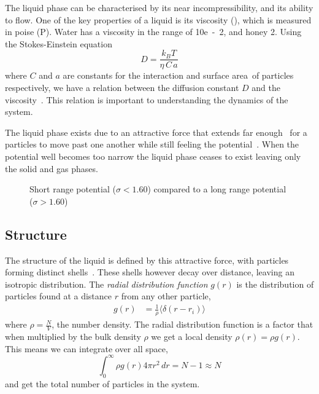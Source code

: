 The liquid phase can be characterised by its near incompressibility, and its ability to flow. One of the key properties of a liquid is its viscosity (\eta), which is measured in poise (P). Water has a viscosity in the range of \si{10e-2}{\poise}, and honey \si{2}{\poise}. Using the Stokes-Einstein equation
\begin{equation}
    D=\frac{k_B T}{\eta\,C\,a}
\end{equation}
where $C$ and $a$ are constants for the interaction and surface area~\tocheck of particles respectively, we have a relation between the diffusion constant $D$ and the viscosity~\tocite. This relation is important to understanding the dynamics of the system.

The liquid phase exists due to an attractive force that extends far enough~ for a particles to move past one another while still feeling the potential~\cite{tejero:94}. When the potential well becomes too narrow the liquid phase ceases to exist leaving only the solid and gas phases.

\begin{figure}
    \label{fig:potentials}
    \caption{Short range potential ($\sigma < 1.60$) compared to a long range potential ($\sigma > 1.60$)}
\end{figure}

\subsection{Structure}
The structure of the liquid is defined by this attractive force, with particles forming distinct shells~. These shells however decay over distance, leaving an isotropic distribution. The \emph{radial distribution function} $g(r)$ is the distribution of particles found at a distance $r$ from any other particle,
\begin{align}
    g(r) &= \frac{1}{\rho} \langle \delta(r - r_i) \rangle
\end{align}
where $\rho = \frac{N}{V}$, the number density. The radial distribution function is a factor that when multiplied by the bulk density $\rho$ we get a local density $\rho(r) = \rho g(r)$. This means we can integrate over all space,
\begin{equation}
    \int_0^\infty \rho g(r) 4 \pi r^2\,dr = N-1 \approx N
\end{equation}
and get the total number of particles in the system.

